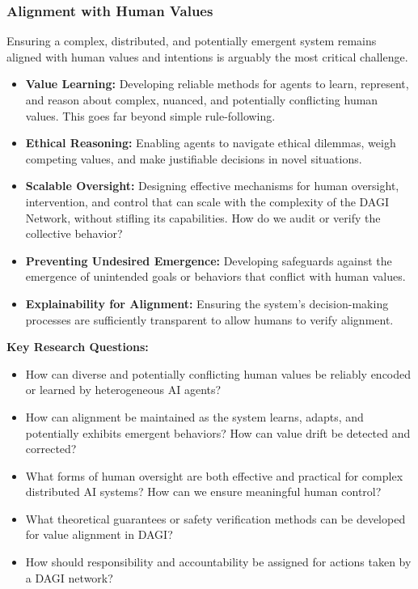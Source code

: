 \documentclass[12pt]{amsart}
\begin{document}
\subsubsection{Alignment with Human Values}
\label{subsubsec:alignment}
Ensuring a complex, distributed, and potentially emergent system remains aligned with human values and intentions is arguably the most critical challenge.
\begin{itemize}[leftmargin=*]
    \item \textbf{Value Learning:} Developing reliable methods for agents to learn, represent, and reason about complex, nuanced, and potentially conflicting human values. This goes far beyond simple rule-following.
    \item \textbf{Ethical Reasoning:} Enabling agents to navigate ethical dilemmas, weigh competing values, and make justifiable decisions in novel situations.
    \item \textbf{Scalable Oversight:} Designing effective mechanisms for human oversight, intervention, and control that can scale with the complexity of the DAGI Network, without stifling its capabilities. How do we audit or verify the collective behavior?
    \item \textbf{Preventing Undesired Emergence:} Developing safeguards against the emergence of unintended goals or behaviors that conflict with human values.
    \item \textbf{Explainability for Alignment:} Ensuring the system's decision-making processes are sufficiently transparent to allow humans to verify alignment.
\end{itemize}
\textbf{Key Research Questions:}
\begin{itemize}[leftmargin=*, label={--}]
    \item How can diverse and potentially conflicting human values be reliably encoded or learned by heterogeneous AI agents?
    \item How can alignment be maintained as the system learns, adapts, and potentially exhibits emergent behaviors? How can value drift be detected and corrected?
    \item What forms of human oversight are both effective and practical for complex distributed AI systems? How can we ensure meaningful human control?
    \item What theoretical guarantees or safety verification methods can be developed for value alignment in DAGI?
    \item How should responsibility and accountability be assigned for actions taken by a DAGI network?
\end{itemize}
\end{document}
